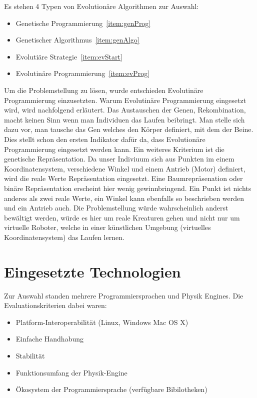     Es stehen 4 Typen von Evolutionäre Algorithmen zur Auswahl:
    \begin{itemize}
      \item Genetische Programmierung~\ref{item:genProg}
      \item Genetischer Algorithmus~\ref{item:genAlgo}
      \item Evolutiäre Strategie~\ref{item:evStart}
      \item Evolutinäre Programmierung~\ref{item:evProg}
    \end{itemize}
    Um die Problemstellung zu lösen, wurde entschieden Evolutinäre Programmierung einzusetzten.
    Warum Evolutinäre Programmierung eingesetzt wird, wird nachfolgend erläutert.
    Das Austauschen der Genen, Rekombination, macht keinen Sinn wenn man Individuen das Laufen beibringt.
    Man stelle sich dazu vor, man tausche das Gen welches den Körper definiert, mit dem der Beine.
    Dies stellt schon den ersten Indikator dafür da,
    dass Evolutionäre Programmierung eingesetzt werden kann. Ein weiteres Kriterium ist die genetische Repräsentation.
    Da unser Indiviuum sich aus Punkten im einem Koordinatensystem,
    verschiedene Winkel und einem Antrieb (Motor) definiert, wird die reale Werte Repräsentation eingesetzt.
    Eine Baumrepräsenation oder binäre Repräsentation erscheint hier wenig gewinnbringend.
    Ein Punkt ist nichts anderes als zwei reale Werte,
    ein Winkel kann ebenfalls so beschrieben werden und ein Antrieb auch.
    Die Problemstellung würde wahrscheinlich anderst bewältigt werden,
    würde es hier um reale Kreaturen gehen und nicht nur um virtuelle Roboter,
    welche in einer künstlichen Umgebung (virtuelles Koordinatensystem) das Laufen lernen.

  \section{Eingesetzte Technologien\label{sec:Technology}}

    Zur Auswahl standen mehrere Programmiersprachen und Physik Engines.
    Die Evaluationskriterien dabei waren:
    \begin{itemize}
      \item Platform-Interoperabilität (Linux, Windows Mac OS X)
      \item Einfache Handhabung
      \item Stabilität
      \item Funktionsumfang der Physik-Engine
      \item Ökosystem der Programmiersprache (verfügbare Bibilotheken)
    \end{itemize}

